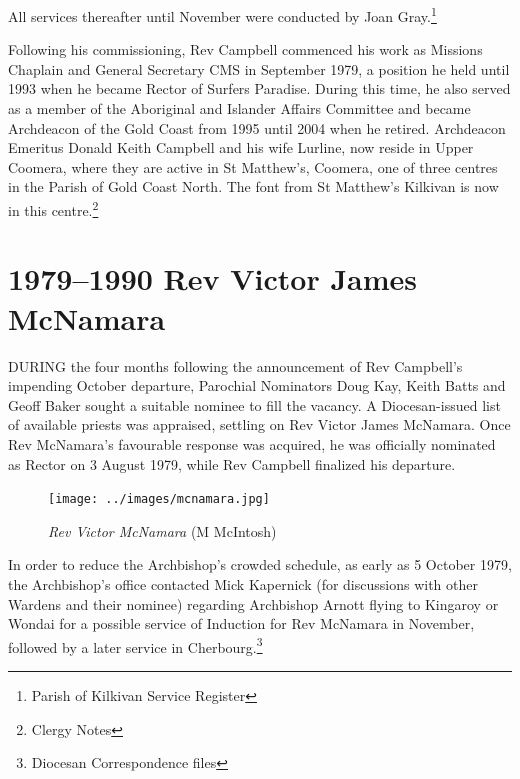 All services thereafter until November were conducted by Joan Gray.\footnote{Parish of Kilkivan Service Register}


\balance


Following his commissioning, Rev Campbell commenced his work as Missions Chaplain and General Secretary CMS in September 1979, a position he held until 1993 when he became Rector of Surfers Paradise. During this time, he also served as a member of the Aboriginal and Islander Affairs Committee and became Archdeacon of the Gold Coast from 1995 until 2004 when he retired. Archdeacon Emeritus Donald Keith Campbell and his wife Lurline, now reside in Upper Coomera, where they are active in St Matthew's, Coomera, one of three centres in the Parish of Gold Coast North. The font from St Matthew's Kilkivan is now in this centre.\footnote{Clergy Notes}


\printendnotes[custom]
\setcounter{endnote}{0}




\chapter{1979--1990 Rev Victor James McNamara}
\nobalance


\lettrine[lines=3]{D}{URING}
 the four months following the announcement of Rev Campbell's impending October departure, Parochial Nominators Doug Kay, Keith Batts and Geoff Baker sought a suitable nominee to fill the vacancy. A Diocesan-issued list of available priests was appraised, settling on Rev Victor James McNamara. Once Rev McNamara's favourable response was acquired, he was officially nominated as Rector on 3 August 1979, while Rev Campbell finalized his departure.







\begin{figure}
\begin{center}
\texttt{[image: ../images/mcnamara.jpg]}
\caption{{\itshape Rev Victor McNamara} {\scriptsize(M McIntosh)}}
\end{center}
\end{figure}




In order to reduce the Archbishop's crowded schedule, as early as 5 October 1979, the Archbishop's office contacted Mick Kapernick (for discussions with other Wardens and their nominee) regarding Archbishop Arnott flying to Kingaroy or Wondai for a possible service of Induction for Rev McNamara in November, followed by a later service in Cherbourg.\footnote{Diocesan Correspondence files}



